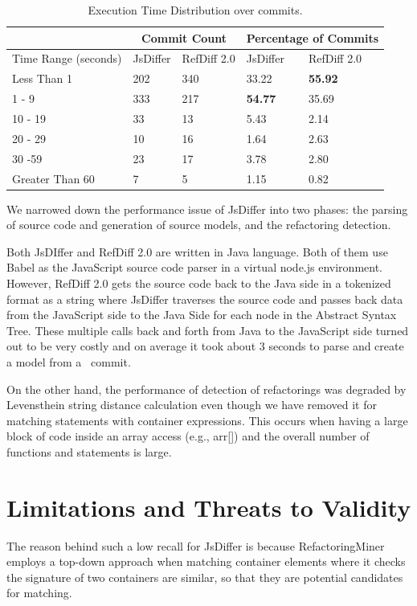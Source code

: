 \documentclass[letterpaper,12pt,onecolumn,final]{report}
\begin{document}
\begin{table}[!ht]
    \centering
    \caption{Execution Time Distribution over \evTotalCommits{} commits.}
    \begin{tabular}{|l|l|l|l|l|}
    \hline
        & \multicolumn{2}{|c|}{Commit Count} & \multicolumn{2}{|c|}{Percentage of Commits} \\ \hline
        Time Range (seconds) & JsDiffer & RefDiff 2.0 & JsDiffer & RefDiff 2.0 \\ \hline
        Less Than 1 & 202 & 340 & 33.22 & \bfseries 55.92 \\ \hline
        1 - 9 & 333 & 217 & \bfseries54.77 & 35.69 \\ \hline
        10 - 19 & 33 & 13 & 5.43 & 2.14 \\ \hline
        20 - 29 & 10 & 16 & 1.64 & 2.63 \\ \hline
        30 -59 & 23 & 17 & 3.78 & 2.80 \\ \hline
        Greater Than 60 & 7 & 5 & 1.15 & 0.82 \\ \hline
    \end{tabular}
    \label{table:performancecomparison}
\end{table}

We narrowed down the performance issue of JsDiffer into two phases: the parsing of source code and generation of source models, and the refactoring detection.

Both JsDIffer and RefDiff 2.0 are written in Java language. Both of them use Babel as the JavaScript source code parser in a virtual node.js environment. However, RefDiff 2.0 gets the source code back to the Java side in a tokenized format as a string where JsDiffer traverses the source code and passes back data from the JavaScript side to the Java Side for each node in the Abstract Syntax Tree. These multiple calls back and forth from Java to the JavaScript side turned out to be very costly and on average it took about 3 seconds to parse and create a model from a  commit.

On the other hand, the performance of detection of refactorings was degraded by Levensthein string distance calculation even though we have removed it for matching statements with container expressions. This occurs when having a large block of code inside an array access (e.g., arr[]) and the overall number of functions and statements is large.

\section{Limitations and Threats to Validity}
The reason behind such a low recall for JsDiffer is because RefactoringMiner employs a top-down approach when matching container elements where it checks the signature of two containers are similar, so that they are potential candidates for matching.
\end{document}
